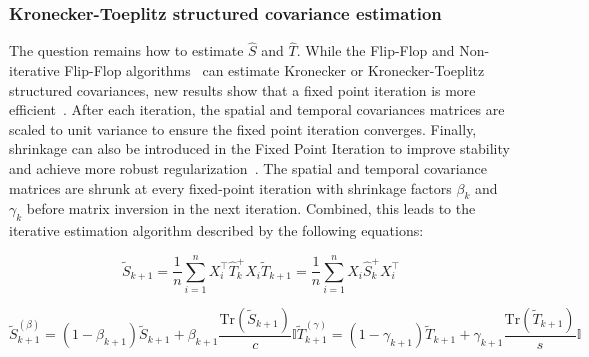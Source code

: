 	\subsubsection{Kronecker-Toeplitz structured covariance estimation}
	\label{sec:structured_covariance}
	The question remains how to estimate $\hat{S}$ and $\hat{T}$.
	While the Flip-Flop and Non-iterative Flip-Flop
	algorithms~\cite{Lu2005, Werner2008, Wirfaelt2010} can estimate Kronecker or Kronecker-Toeplitz structured covariances, new results show that a fixed point iteration is more efficient~\cite{Wiesel2012a,Wiesel2012}.
	After each iteration, the spatial and temporal covariances matrices are scaled to unit
	variance to ensure the fixed point iteration converges.
	Finally, shrinkage can also be introduced in the Fixed Point Iteration to
	improve stability and achieve more robust
	regularization~\cite{Wiesel2012,Greenewald2014,Beltrachini2013, Breloy2016}.
	The spatial and temporal covariance matrices are shrunk at every fixed-point
	iteration with shrinkage factors $\beta_k$ and $\gamma_k$ before matrix
	inversion in the
	next iteration.
	Combined, this leads to the iterative estimation algorithm described by the
	following equations:

	\begin{subequations}
		\begin{equation}
			\tilde{S}_{k+1} =
			\frac{1}{n}
			\sum^n_{i=1}X_i^\intercal\hat{T}_k^+X_i
			\label{eq:fpi_spatial}
		\end{equation}
		\begin{equation}
			\tilde{T}_{k+1} =
			\frac{1}{n}
			\sum^n_{i=1}X_i\hat{S}_k^+X_i^\intercal
			\label{eq:fpi_temporal}
		\end{equation}
	\end{subequations}



	\begin{subequations}
		\begin{equation}
			\tilde{S}_{k+1}^{(\beta)} =
			(1-\beta_{k+1})\tilde{S}_{k+1}
			+\beta_{k+1}\frac{\text{Tr}(\tilde{S}_{k+1})}{c}\mathbb{I}
			\label{eq:fpi_spatial_shrunk}
		\end{equation}
		\begin{equation}
			\tilde{T}_{k+1}^{(\gamma)} =
			(1-\gamma_{k+1})\tilde{T}_{k+1}
			+\gamma_{k+1}\frac{\text{Tr}(\tilde{T}_{k+1})}{s}\mathbb{I}
			\label{eq:fpi_temporal_shrunk}
		\end{equation}
	\end{subequations}



